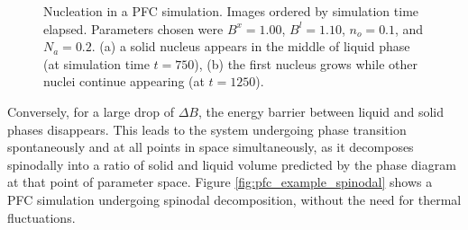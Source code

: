 \begin{figure}[h]
    \centering
{}
    \caption{Nucleation in a PFC simulation. Images ordered by simulation time elapsed. Parameters chosen were $B^x=1.00$, $B^l=1.10$, $n_o=0.1$, and $N_a=0.2$. (a) a solid nucleus appears in the middle of liquid phase (at simulation time $t=750$), (b) the first nucleus grows while other nuclei continue appearing (at $t=1250$).}\label{fig:pfc_example_nucleation}
\end{figure}

Conversely, for a large drop of $\Delta B$, the energy barrier between liquid and solid phases disappears. This leads to the system undergoing phase transition spontaneously and at all points in space simultaneously, as it decomposes spinodally into a ratio of solid and liquid volume predicted by the phase diagram at that point of parameter space. Figure \ref{fig:pfc_example_spinodal} shows a PFC simulation undergoing spinodal decomposition, without the need for thermal fluctuations.

